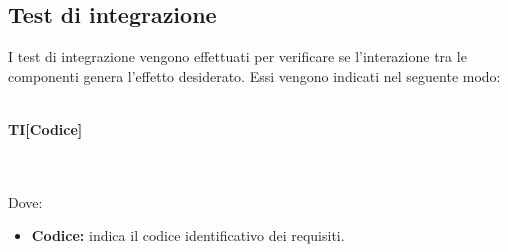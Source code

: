 \newpage
\subsection{Test di integrazione}

I test di integrazione vengono effettuati per verificare se l'interazione tra le componenti genera l'effetto desiderato. Essi vengono indicati nel seguente modo:\\\\
\centerline{\textbf{TI[Codice]}}\\\\
Dove:
\begin{itemize}
	\item \textbf{Codice:} indica il codice identificativo dei requisiti.
\end{itemize}
\renewcommand{\arraystretch}{1.5}
